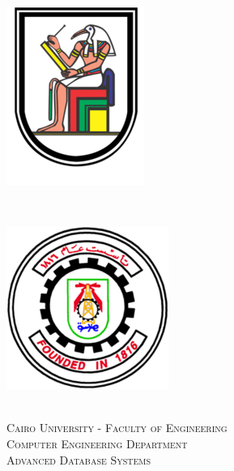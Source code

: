 \documentclass[a4paper,12pt]{article}
\begin{document}
\begin{titlepage}
\newcommand{\HRule}{\rule{\linewidth}{0.5mm}} %
\setlength{\topmargin}{0in}
\center %
 
 \begin{minipage}{0.4\textwidth}
\begin{flushleft} \large
\hspace*{-0.5cm}
\includegraphics[scale=4]{images/uni_logo.png}\\
\end{flushleft}
\end{minipage}
~
\begin{minipage}{0.5\textwidth}
\begin{flushright} \large
\hspace*{2cm}
\includegraphics[scale=0.6]{images/fac_logo.png}\\
\end{flushright}
\end{minipage}\\[1cm]

\textsc{\Large Cairo University - Faculty of Engineering}\\[0.5cm] %
\textsc{Computer Engineering Department} \\[0.5cm] 
\textsc{Advanced Database Systems} \\[0.5cm] 
\textsc{\large }\\[0.5cm] %


\end{titlepage}
\end{document}
